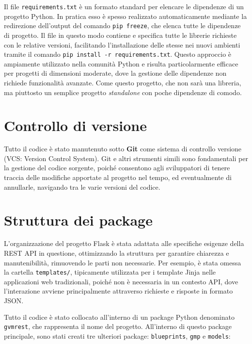 Il file \texttt{requirements.txt} è un formato standard per elencare le dipendenze di un progetto Python. In pratica esso è spesso realizzato automaticamente mediante la redirezione dell'output del comando \texttt{pip freeze}, che elenca tutte le dipendenze di progetto. Il file in questo modo contiene e specifica tutte le librerie richieste con le relative versioni, facilitando l'installazione delle stesse nei nuovi ambienti tramite il comando \texttt{pip install -r requirements.txt}. Questo approccio è ampiamente utilizzato nella comunità Python e risulta particolarmente efficace per progetti di dimensioni moderate, dove la gestione delle dipendenze non richiede funzionalità avanzate. Come questo progetto, che non sarà una libreria, ma piuttosto un semplice progetto \emph{standalone} con poche dipendenze di comodo.

\section{Controllo di versione}
Tutto il codice è stato manutenuto sotto \textbf{Git} come sistema di controllo versione (VCS: Version Control System). Git e altri strumenti simili sono fondamentali per la gestione del codice sorgente, poiché consentono agli sviluppatori di tenere traccia delle modifiche apportate al progetto nel tempo, ed eventualmente di annullarle, navigando tra le varie versioni del codice.

\section{Struttura dei package}
L'organizzazione del progetto Flask è stata adattata alle specifiche esigenze della REST API in questione, ottimizzando la struttura per garantire chiarezza e manutenibilità, rimuovendo le parti non necessarie. Per esempio, è stata omessa la cartella \texttt{templates/}, tipicamente utilizzata per i template Jinja nelle applicazioni web tradizionali, poiché non è necessaria in un contesto API, dove l'interazione avviene principalmente attraverso richieste e risposte in formato JSON.

Tutto il codice è stato collocato all'interno di un package Python denominato \texttt{gvmrest}, che rappresenta il nome del progetto. All'interno di questo package principale, sono stati creati tre ulteriori package: \texttt{blueprints}, \texttt{gmp} e \texttt{models}:

